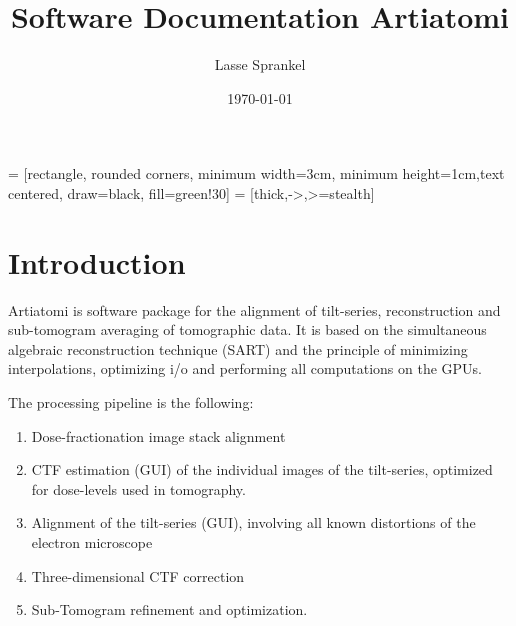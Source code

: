 \documentclass[12pt,a4paper]{scrartcl}
\begin{document}
	
 = [rectangle, rounded corners, minimum width=3cm, minimum height=1cm,text centered, draw=black, fill=green!30]
 = [thick,->,>=stealth]	
	


\setlength{\parindent}{0em} 
\title{\textbf{Software Documentation Artiatomi}}
\author{Lasse Sprankel} \date{\today}
\maketitle

\tableofcontents
\newpage
{}

\section{Introduction}

Artiatomi is software package for the alignment of tilt-series, reconstruction and sub-tomogram averaging of tomographic data. It is based on the simultaneous algebraic reconstruction technique (SART) and the principle of minimizing interpolations, optimizing i/o and performing all computations on the GPUs.  

The processing pipeline is the following: 
\begin{enumerate}

\item Dose-fractionation image stack alignment
\item CTF estimation (GUI) of the individual images of the tilt-series, optimized for dose-levels used in tomography.  
\item Alignment of the tilt-series (GUI), involving all known distortions of the electron microscope
\item Three-dimensional CTF correction
\item Sub-Tomogram refinement and optimization. 
\end{enumerate}
\end{document}
